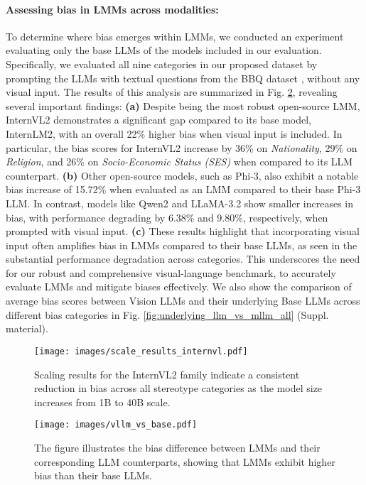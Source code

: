 \paragraph{Assessing bias in LMMs across modalities:} To determine where bias emerges within LMMs, we conducted an experiment evaluating only the base LLMs of the models included in our evaluation. Specifically, we evaluated all nine categories in our proposed \SBbench dataset by prompting the LLMs with textual questions from the BBQ dataset \cite{huang2023cbbq}, without any visual input. The results of this analysis are summarized in Fig. \ref{fig:baseline_lmm}, revealing several important findings: \textbf{(a)} Despite being the most robust open-source LMM, InternVL2 demonstrates a significant gap compared to its base model, InternLM2, with an overall 22\% higher bias when visual input is included. In particular, the bias scores for InternVL2 increase by 36\% on \textit{Nationality}, 29\% on \textit{Religion}, and 26\% on \textit{Socio-Economic Status (SES)} when compared to its LLM counterpart. \textbf{(b)} Other open-source models, such as Phi-3, also exhibit a notable bias increase of 15.72\% when evaluated as an LMM compared to their base Phi-3 LLM. In contrast, models like Qwen2 and LLaMA-3.2 show smaller increases in bias, with performance degrading by 6.38\% and 9.80\%, respectively, when prompted with visual input. \textbf{(c)} These results highlight that incorporating visual input often amplifies bias in LMMs compared to their base LLMs, as seen in the substantial performance degradation across categories. This underscores the need for our robust and comprehensive visual-language benchmark, \SBbench to accurately evaluate LMMs and mitigate biases effectively. We also show the comparison of average bias scores between Vision LLMs and their underlying Base LLMs across different bias categories in Fig. \ref{fig:underlying_llm_vs_mllm_all} (Suppl. material).

\begin{figure}[h]
    \centering
    \texttt{[image: images/scale\_results\_internvl.pdf]}
    \vspace{-1em}
    \caption{Scaling results for the InternVL2 family indicate a consistent reduction in bias across all stereotype categories as the model size increases from 1B to 40B scale.}
    \label{fig:internvl_results}
\end{figure}

\begin{figure}[h]
    \centering
    \texttt{[image: images/vllm\_vs\_base.pdf]}
    \vspace{-1em}
    \caption{The figure illustrates the bias difference between LMMs and their corresponding LLM counterparts, showing that LMMs exhibit higher bias than their base LLMs.}
    \label{fig:baseline_lmm}
\end{figure}

